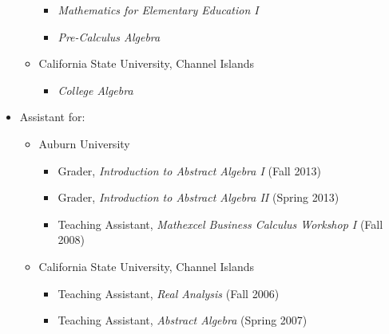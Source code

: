 \documentclass[11pt]{article}
\begin{document}
\begin{itemize}
\begin{itemize}
\begin{itemize}
\newpage

        \item{} \emph{Mathematics for Elementary Education I}
        \item{} \emph{Pre-Calculus Algebra}
      \end{itemize}
      \item{} California State University, Channel Islands
      \begin{itemize}
        \item{} \emph{College Algebra}
      \end{itemize}
    \end{itemize}
    \item{} Assistant for:
    \begin{itemize}
      \item{} Auburn University
      \begin{itemize}
        \item{}
          Grader,
          \emph{Introduction to Abstract Algebra I}
          (Fall 2013)
        \item{}
          Grader,
          \emph{Introduction to Abstract Algebra II}
          (Spring 2013)
        \item{}
          Teaching Assistant,
          \emph{Mathexcel Business Calculus Workshop I}
          (Fall 2008)
      \end{itemize}
      \item{} California State University, Channel Islands
      \begin{itemize}
        \item{}
          Teaching Assistant,
          \emph{Real Analysis}
          (Fall 2006)
        \item{}
          Teaching Assistant,
          \emph{Abstract Algebra}
          (Spring 2007)
      \end{itemize}
    \end{itemize}
  \end{itemize}
\end{document}
